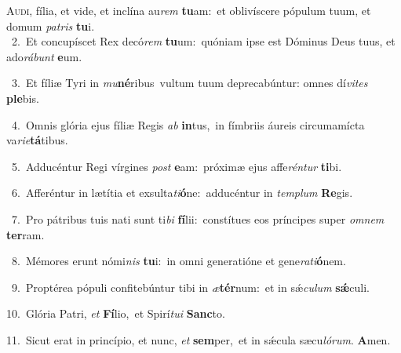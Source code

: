 \lettrine{\initial\textcolor{\initialcolor}{A}}{udi,} fília, et vide, et inclína au\textit{rem} \textbf{tu}\-am:~\star et oblivíscere pópulum tuum, et domum \textit{pa}\-\textit{tris} \textbf{tu}\-i.\\
{\numbfont\textcolor{\numbcolor}{~2.}}~Et concupíscet Rex decó\textit{rem} \textbf{tu}\-um:~\star quóniam ipse est Dóminus Deus tuus, et ado\-\textit{rá}\-\textit{bunt} \textbf{e}\-um.\par
{\numbfont\textcolor{\numbcolor}{~3.}}~Et fíliæ Tyri in \textit{mu}\-\textbf{né}ribus~\star vultum tuum deprecabúntur: omnes dí\-\textit{vi}\-\textit{tes} \textbf{ple}\-bis.\par
{\numbfont\textcolor{\numbcolor}{~4.}}~Omnis glória ejus fíliæ Regis \textit{ab} \textbf{in}\-tus,~\star in fímbriis áureis circumamícta va\-\textit{ri}\-\textit{e}\textbf{tá}tibus.\par
{\numbfont\textcolor{\numbcolor}{~5.}}~Adducéntur Regi vírgines \textit{post} \textbf{e}\-am:~\star próximæ ejus affe\-\textit{rén}\-\textit{tur} \textbf{ti}\-bi.\par
{\numbfont\textcolor{\numbcolor}{~6.}}~Afferéntur in lætítia et exsulta\-\textit{ti}\-\textbf{ó}ne:~\star adducéntur in \textit{tem}\-\textit{plum} \textbf{Re}\-gis.\par
{\numbfont\textcolor{\numbcolor}{~7.}}~Pro pátribus tuis nati sunt ti\textit{bi} \textbf{fí}\-lii:~\star constítues eos príncipes super \textit{om}\-\textit{nem} \textbf{ter}\-ram.\par
{\numbfont\textcolor{\numbcolor}{~8.}}~Mémores erunt nómi\textit{nis} \textbf{tu}\-i:~\star in omni generatióne et gene\-\textit{ra}\-\textit{ti}\textbf{ó}nem.\par
{\numbfont\textcolor{\numbcolor}{~9.}}~Proptérea pópuli confitebúntur tibi in \textit{æ}\-\textbf{tér}num:~\star et in sǽ\-\textit{cu}\-\textit{lum} \textbf{sǽ}\-culi.\par
{\numbfont\textcolor{\numbcolor}{10.}}~Glória Patri, \textit{et} \textbf{Fí}\-lio,~\star et Spirí\-\textit{tu}\-\textit{i} \textbf{Sanc}\-to.\par
{\numbfont\textcolor{\numbcolor}{11.}}~Sicut erat in princípio, et nunc, \textit{et} \textbf{sem}\-per,~\star et in sǽcula sæcu\-\textit{ló}\-\textit{rum}. \textbf{A}\-men.\par
